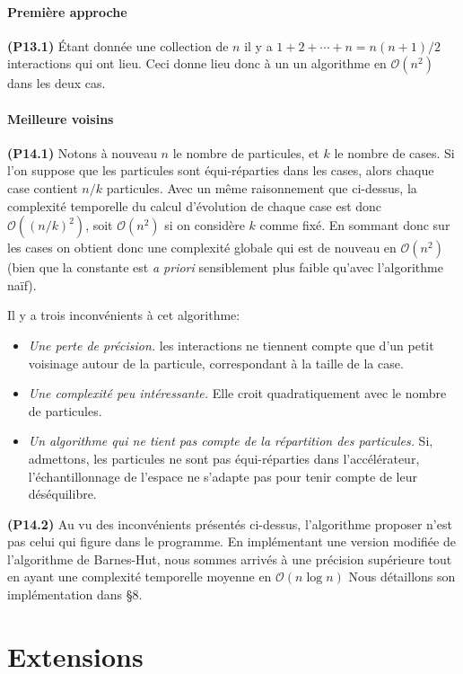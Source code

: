 \documentclass[12pt, letterpaper, twoside]{article}
\def\O{\mathcal{O}}
\begin{document}
\subsection{Première approche}
\noindent \textbf{(P13.1)} Étant donnée une collection de $n$ il y a $1+2+\cdots+n = n(n+1)/2$ interactions qui ont lieu. Ceci donne lieu donc à un un algorithme en $\O(n^2)$ dans les deux cas.

\subsection{Meilleure voisins}
\noindent \textbf{(P14.1)} Notons à nouveau $n$ le nombre de particules, et $k$ le nombre de cases. Si l'on suppose que les particules sont équi-réparties dans les cases, alors chaque case contient $n/k$ particules. Avec un même raisonnement que ci-dessus, la complexité temporelle du calcul d'évolution de chaque case est donc $\O((n/k)^2)$, soit $\O(n^2)$ si on considère $k$ comme fixé. En sommant donc sur les cases on obtient donc une complexité globale qui est de nouveau en $\O(n^2)$ (bien que la constante est \textit{a priori} sensiblement plus faible qu'avec l'algorithme naïf).

Il y a trois inconvénients à cet algorithme:
\begin{itemize}
	\item \textit{Une perte de précision.} les interactions ne tiennent compte que d'un petit voisinage autour de la particule, correspondant à la taille de la case.
	\item \textit{Une complexité peu intéressante.} Elle croit quadratiquement avec le nombre de particules.
	\item \textit{Un algorithme qui ne tient pas compte de la répartition des particules.} Si, admettons, les particules ne sont pas équi-réparties dans l'accélérateur, l'échantillonnage de l'espace ne s'adapte pas pour tenir compte de leur déséquilibre.
\end{itemize}

\noindent \textbf{(P14.2)} Au vu des inconvénients présentés ci-dessus, l'algorithme proposer n'est pas celui qui figure dans le programme. En implémentant une version modifiée de l'algorithme de Barnes-Hut, nous sommes arrivés à une précision supérieure tout en ayant une complexité temporelle moyenne en $\O(n \log n)$ Nous détaillons son implémentation dans \S 8.

\newpage

\part*{Extensions}
\end{document}

